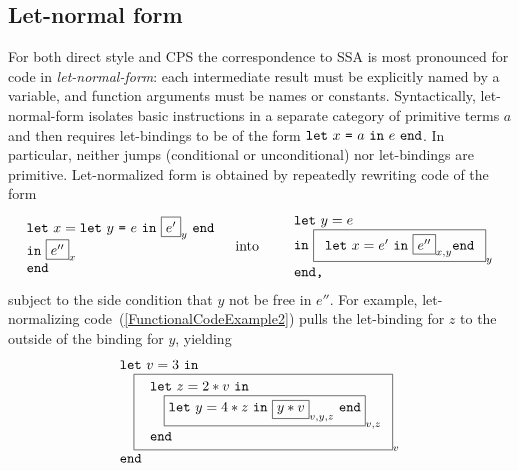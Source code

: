 
\subsection{Let-normal form}
\label{section:Part1:Semantics:LetNormalForm}
For both direct style and CPS the correspondence to SSA is most
pronounced for code in \emph{let-normal-form}: each intermediate
result must be explicitly named by a variable, and function arguments
must be names or constants. Syntactically, let-normal-form isolates
basic instructions in a separate category of primitive terms $a$ and
then requires let-bindings to be of the form $\texttt{let}\ {x}\ \texttt{=}\ {a}\ \texttt{in}\ {e}\ \texttt{end}$.  In
particular, neither jumps (conditional or unconditional) nor
let-bindings are primitive. Let-normalized form is obtained by
repeatedly rewriting code of the form
\begin{eqnarray*}
 \begin{array}{l}
   \texttt{let}\ x = \letin y {e} {\fbox{$e'$}_y}\\
   \texttt{in}\ {\fbox{$e''$}_{x}}\\ 
   \texttt{end}
  \end{array}
& \quad \textrm{into} \quad &
  \begin{array}{l}
    \texttt{let}\ y = e\\
    \texttt{in}\ \fbox{$\begin{array}{l}
                            \texttt{let}\ x = {e'}\ 
                            \texttt{in}\ {\fbox{$e''$}_{x,y}}
                            \texttt{end}
                        \end{array}$}_y\\
    \texttt{end,}
  \end{array}
\end{eqnarray*}
subject to the side condition that $y$ not be free in $e''$.
For example, let-normalizing code~(\ref{FunctionalCodeExample2}) pulls the
let-binding for $z$ to the outside of the binding for $y$, yielding
\begin{equation}
\label{FunctionalCodeExample4}
\begin{array}{l}
\texttt{let}\ v = 3\ \texttt{in}\\
\quad 
  {\fbox{
   $\begin{array}[t]{l} 
     \texttt{let}\ z=2*v \ \texttt{in}\\
     \quad {\fbox{$\texttt{let}\ y = 4*z\ \texttt{in}\ 
                 \fbox{$y*v$}_{v,y,z}\ \texttt{end}$}_{v,z}}\\
     \texttt{end}
   \end{array}$}_{v}}\\
\texttt{end}
\end{array}
\end{equation}

